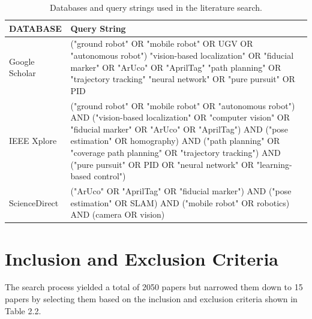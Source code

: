 \begin{table}[htbp]
\centering
\setlength{\tabcolsep}{4pt}
\begin{tabular}{>{\raggedright\arraybackslash}p{3cm}
                >{\raggedright\arraybackslash}p{11cm}}
\hline
\textbf{DATABASE} & \textbf{Query String} \\
\hline
Google Scholar &
("ground robot" OR "mobile robot" OR UGV OR "autonomous robot")
"vision-based localization" OR "fiducial marker" OR "ArUco" OR "AprilTag"
"path planning" OR "trajectory tracking"
"neural network" OR "pure pursuit" OR PID \\
\hline
IEEE Xplore &
("ground robot" OR "mobile robot" OR "autonomous robot")
AND ("vision-based localization" OR "computer vision" OR "fiducial marker" OR "ArUco" OR "AprilTag")
AND ("pose estimation" OR homography)
AND ("path planning" OR "coverage path planning" OR "trajectory tracking")
AND ("pure pursuit" OR PID OR "neural network" OR "learning-based control") \\
\hline
ScienceDirect &
("ArUco" OR "AprilTag" OR "fiducial marker")
AND ("pose estimation" OR SLAM)
AND ("mobile robot" OR robotics)
AND (camera OR vision) \\
\hline
\end{tabular}
\caption{Databases and query strings used in the literature search.}
\label{tab:search_queries}
\end{table}

\section[Inclusion and Exclusion Criteria]{Inclusion and Exclusion Criteria}

The search process yielded a total of 2050 papers but narrowed them down to 15 papers by selecting them based on the inclusion and exclusion criteria shown in Table 2.2.


